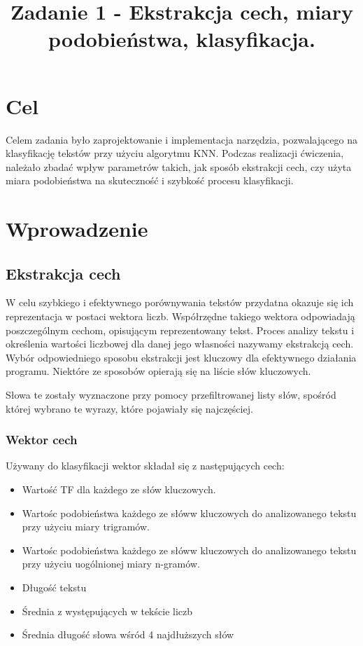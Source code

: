 \documentclass{classrep}
\author{
  \studentinfo{Paweł Młynarczyk}{210278} \and
  \studentinfo{Mateusz Kuźniarek}{210245}
}
\title{Zadanie 1 - Ekstrakcja cech, miary podobieństwa, klasyfikacja.}
\begin{document}
\maketitle

\section{Cel}
Celem zadania było zaprojektowanie i implementacja narzędzia, pozwalającego na klasyfikację tekstów przy użyciu algorytmu KNN. Podczas realizacji ćwiczenia, należało zbadać wpływ parametrów takich, jak sposób ekstrakcji cech, czy użyta miara podobieństwa na skuteczność i szybkość procesu klasyfikacji.

\section{Wprowadzenie}
\subsection{Ekstrakcja cech}
W celu szybkiego i efektywnego porównywania tekstów przydatna okazuje się ich reprezentacja w postaci wektora liczb. Współrzędne takiego wektora odpowiadają poszczególnym cechom, opisującym reprezentowany tekst. Proces analizy tekstu i określenia wartości liczbowej dla danej jego własności nazywamy ekstrakcją cech. Wybór odpowiedniego sposobu ekstrakcji jest kluczowy dla efektywnego działania programu. Niektóre ze sposobów opierają się na liście słów kluczowych.

Słowa te zostały wyznaczone przy pomocy przefiltrowanej listy słów, spośród której wybrano te wyrazy, które pojawiały się najczęściej.

\subsubsection{Wektor cech}
Używany do klasyfikacji wektor składał się z następujących cech:
\begin{itemize}
	\item Wartość TF dla każdego ze słów kluczowych.
	\item Wartośc podobieństwa każdego ze słóww kluczowych do analizowanego tekstu przy użyciu miary trigramów.
	\item Wartośc podobieństwa każdego ze słóww kluczowych do analizowanego tekstu przy użyciu uogólnionej miary n-gramów.
	\item Długość tekstu
	\item Średnia z występujących w tekście liczb
	\item Średnia długość słowa wśród 4 najdłuższych słów
\end{itemize}
\end{document}
